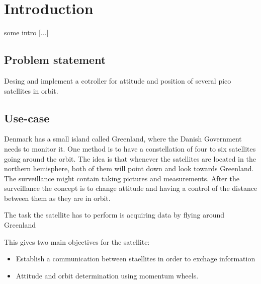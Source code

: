 \chapter{Introduction}\label{chap:Introduction}
%
\cite{Biezl}
some intro [...]

%
\section{Problem statement}
%
Desing and implement a cotroller for attitude and position of several pico satellites in orbit.
%
\section{Use-case}\label{sec:useCase}
%
Denmark has a small island called Greenland, where the Danish Government needs to monitor it.
One method is to have a constellation of four to six satellites going around the orbit. The idea is that whenever the satellites are located in the northern hemisphere, both of them will point down and look towards Greenland. The surveillance might contain taking pictures and measurements. After the surveillance the concept is to change attitude and having a control of the distance between them as they are in orbit.

The task the satellite has to perform is acquiring data by flying around Greenland

This gives two main objectives for the satellite: 

\vspace{-0.5cm}
\begin{itemize}
	\item Establish a communication between staellites in order to exchage information
	\item Attitude and orbit determination using momentum wheels.
\end{itemize}
%
